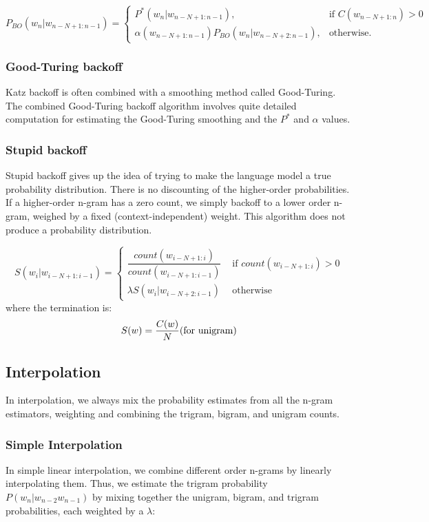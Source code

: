 \[
    P_{BO}(w_n|w_{n-N+1:n-1}) =
\begin{cases} 
    P^*(w_n|w_{n-N+1:n-1}), & \text{if } C(w_{n-N+1:n}) > 0 \\
    \alpha(w_{n-N+1:n-1}) P_{BO}(w_n|w_{n-N+2:n-1}), & \text{otherwise}.
\end{cases}
\]

\subsubsection{Good-Turing backoff}
Katz backoff is often combined with a smoothing method called Good-Turing. The combined Good-Turing backoff algorithm involves quite detailed computation for estimating the Good-Turing smoothing and the $P^*$ and $\alpha$ values.

\subsubsection{Stupid backoff}
Stupid backoff gives up the idea of trying to make the language model a true probability distribution. There is no discounting of the higher-order probabilities. If a higher-order n-gram has a zero count, we simply backoff to a lower order n-gram, weighed by a fixed (context-independent) weight. This algorithm does not produce a probability distribution.

\[
    S(w_i|w_{i-N+1:i-1}) = \begin{cases}
        \dfrac{count(w_{i-N+1:i})}{count(w_{i-N+1:i-1})} & \text{ if $count(w_{i-N+1:i}) > 0$}\\[0.2cm]
        \lambda S(w_i|w_{i-N+2:i-1}) & \text{ otherwise}
    \end{cases}
\]
where the termination is:
\[
    S(w) = \dfrac{C(w)}{N} \hfill \text{(for unigram)}
\]

\subsection{Interpolation}
In interpolation, we always mix the probability estimates from all the n-gram estimators, weighting and combining the trigram, bigram, and unigram counts.

\subsubsection{Simple Interpolation}
In simple linear interpolation, we combine different order n-grams by linearly interpolating them. Thus, we estimate the trigram probability $P(w_n|w_{n-2}w_{n-1})$ by mixing together the unigram, bigram, and trigram probabilities, each weighted by a $\lambda$:

